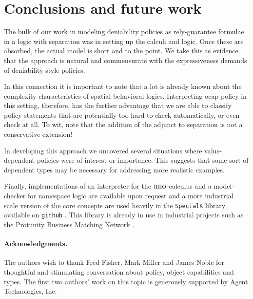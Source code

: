\documentclass[]{acm_proc_article-sp}
\numberwithin{equation}{subsection}
\newcommand{\rhoc}{${\textsc{rho}}$-calculus}
\begin{document}
\section{Conclusions and future work}

The bulk of our work in modeling deniability policies as
rely-guarantee formulae in a logic with separation was in setting up
the calculi and logic. Once these are absorbed, the actual model is
short and to the point. We take this as evidence that the approach is
natural and commensurate with the expressiveness demands of
deniability style policies.

In this connection it is important to note that a lot is already known
about the complexity characteristics of spatial-behavioral
logics. Interpreting ocap policy in this setting, therefore, has the
further advantage that we are able to classify policy statements that
are potentially too hard to check automatically, or even check at
all. To wit, \cite{Caires04eliminationof} note that the addition of
the adjunct to separation is not a conservative extension!

In developing this approach we uncovered several situations where
value-dependent policies were of interest or importance. This suggests
that some sort of dependent types may be necessary for addressing more
realistic examples.

Finally, implementations of an interpreter for the {\rhoc} and a
model-checker for namespace logic are available upon request and a
more industrial scale version of the core concepts are used heavily in
the \texttt{SpecialK} library available on \texttt{github}
\cite{SpecialK}. This library is already in use in industrial projects
such as the Protunity Business Matching Network \cite{Protunity}.

\paragraph{Acknowledgments.}
The authors wish to thank Fred Fisher, Mark Miller and James Noble for thoughtful
and stimulating conversation about policy, object capabilities and
types. The first two authors' work on this topic is generously supported
by Agent Technologies, Inc.




\end{document}
